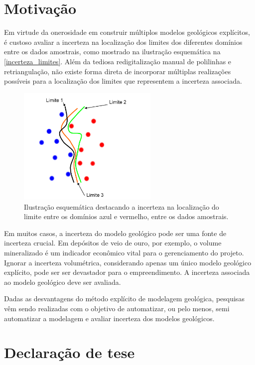 \section{Motivação}

Em virtude da onerosidade em construir múltiplos modelos geológicos explícitos, é custoso avaliar a incerteza na localização dos limites dos diferentes domínios entre os dados amostrais, como mostrado na ilustração esquemática na \autoref{incerteza_limites}. Além da tediosa redigitalização manual de polilinhas e retriangulação, não existe forma direta de incorporar múltiplas realizações possíveis para a localização dos limites que representem a incerteza associada.

\begin{figure}[H]
    \centering
	\caption{\label{incerteza_limites}Ilustração esquemática destacando a incerteza na localização do limite entre os domínios azul e vermelho, entre os dados amostrais.}
	\includegraphics[width=0.6\textwidth]{capitulo_1/imagens/incerteza_limites}
\end{figure}

Em muitos casos, a incerteza do modelo geológico pode ser uma fonte de incerteza crucial. Em depósitos de veio de ouro, por exemplo, o volume mineralizado é um indicador econômico vital para o gerenciamento do projeto. Ignorar a incerteza volumétrica, considerando apenas um único modelo geológico explícito, pode ser ser devastador para o empreendimento. A incerteza associada ao modelo geológico deve ser avaliada.

Dadas as desvantagens do método explícito de modelagem geológica, pesquisas vêm sendo realizadas com o objetivo de automatizar, ou pelo menos, semi automatizar a modelagem e avaliar incerteza dos modelos geológicos.

\section{Declaração de tese}


